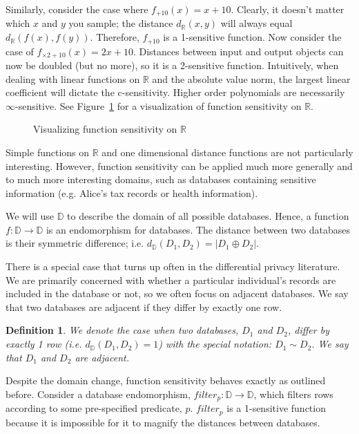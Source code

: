 \documentclass[12pt]{report}
\newtheorem{defn}{Definition}[section]
\begin{document}
Similarly, consider the case where $f_{+10}(x) = x + 10$.
Clearly, it doesn't matter which $x$ and $y$ you sample; the distance $d_{\mathbb R}(x,y)$ will always equal $d_{\mathbb R}(f(x),f(y))$.
Therefore, $f_{+10}$ is a 1-sensitive function.
Now consider the case of $f_{\times 2+10}(x) = 2x + 10$.
Distances between input and output objects can now be doubled (but no more), so it is a 2-sensitive function.
Intuitively, when dealing with linear functions on $\mathbb R$ and the absolute value norm, the largest linear coefficient will dictate the c-sensitivity.
Higher order polynomials are necessarily $\infty$-sensitive.
See Figure~\ref{fig:fn_sens} for a visualization of function sensitivity on $\mathbb R$.

\begin{figure}
    \centering
    \def\svgwidth{\columnwidth}
    
    \caption{Visualizing function sensitivity on $\mathbb{R}$}
    \label{fig:fn_sens}
\end{figure}

Simple functions on $\mathbb R$ and one dimensional distance functions are not particularly interesting.
However, function sensitivity can be applied much more generally and to much more interesting domains, such as databases containing sensitive information (e.g. Alice's tax records or health information).

We will use $\mathbb D$ to describe the domain of all possible databases.
Hence, a function $f : \mathbb D \rightarrow \mathbb D$ is an endomorphism for databases.
The distance between two databases is their symmetric difference; i.e. $d_{\mathbb D}(D_1,D_2) = | D_1 \oplus D_2 |$.

There is a special case that turns up often in the differential privacy literature.
We are primarily concerned with whether a particular individual's records are included in the database or not, so we often focus on adjacent databases.
We say that two databases are adjacent if they differ by exactly one row.

\begin{defn}
  We denote the case when two databases, $D_1$ and $D_2$, differ by exactly 1 row (i.e. $d_{\mathbb D}(D_1,D_2)=1$) with the special notation: $D_1 \sim D_2$.
  We say that $D_1$ and $D_2$ are adjacent.
\end{defn}

Despite the domain change, function sensitivity behaves exactly as outlined before.
Consider a database endomorphism, $filter_p : \mathbb D \rightarrow \mathbb D$, which filters rows according to some pre-specified predicate, $p$.
$filter_p$ is a 1-sensitive function because it is impossible for it to magnify the distances between databases.
\end{document}
